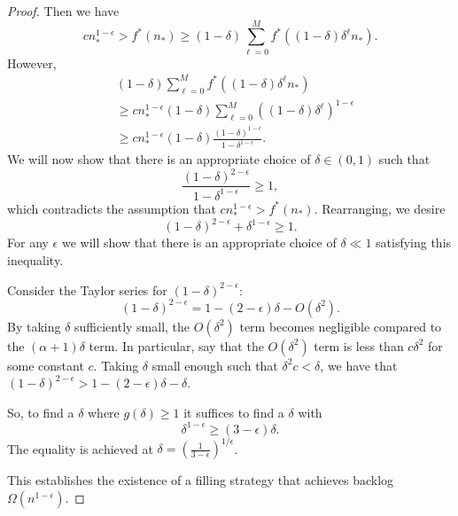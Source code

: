 \documentclass[twocolumn]{article}[11pt]
\begin{document}
\begin{proof}
  Then we have 
  $$cn_*^{1-\epsilon} > f^*(n_*) \ge (1-\delta)\sum_{\ell=0}^M f^*((1-\delta)\delta^\ell n_*).$$
  However, 
  \begin{align*}
  &(1-\delta)\sum_{\ell=0}^M f^*((1-\delta)\delta^\ell n_*) \\
  &\ge cn_*^{1-\epsilon}(1-\delta)\sum_{\ell=0}^M((1-\delta)\delta^\ell)^{1-\epsilon}\\
  &\ge cn_*^{1-\epsilon}(1-\delta) \frac{(1-\delta)^{1-\epsilon}}{1-\delta^{1-\epsilon}}.
  \end{align*}
  We will now show that there is an appropriate choice of $\delta \in (0,1)$
  such that $$\frac{(1-\delta)^{2-\epsilon}}{1-\delta^{1-\epsilon}} \ge 1,$$
  which contradicts the assumption that $c n_*^{1-\epsilon} > f^*(n_*)$.
  Rearranging, we desire $$(1-\delta)^{2-\epsilon} + \delta^{1-\epsilon}\ge 1.$$
  For any $\epsilon$ we will show that there is an appropriate choice of
  $\delta\ll 1$ satisfying this inequality.

  Consider the Taylor series for $(1-\delta)^{2-\epsilon}$:
  $$(1-\delta)^{2-\epsilon} = 1 - (2-\epsilon)\delta - O(\delta^2).$$
  By taking $\delta$ sufficiently small, the $O(\delta^2)$ term becomes
  negligible compared to the $(\alpha+1)\delta$ term. In particular, say that
  the $O(\delta^2)$ term is less than $c \delta^2$ for some constant $c$.
  Taking $\delta$ small enough such that $\delta^2 c < \delta$, we have that
  $(1-\delta)^{2-\epsilon} > 1-(2-\epsilon)\delta - \delta$.
 
  So, to find a $\delta$ where $g(\delta) \ge 1$ it suffices to find a $\delta$ with 
  $$\delta^{1-\epsilon} \ge (3-\epsilon)\delta.$$
  The equality is achieved at $\delta = (\frac{1}{3-\epsilon})^{1/\epsilon}$.

  This establishes the existence of a filling strategy that achieves backlog
  $\Omega(n^{1-\epsilon})$.


\end{proof}
\end{document}
